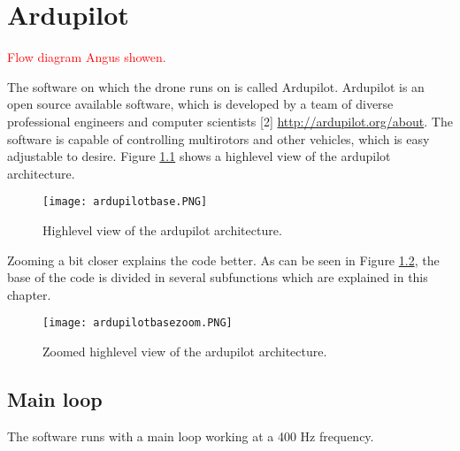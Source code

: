 \chapter{Ardupilot} \label{ch:4}
\textcolor{red}{Flow diagram Angus showen.}

The software on which the drone runs on is called Ardupilot. Ardupilot is an open source available software, which is developed by a team of diverse professional engineers and computer scientists [2] \url{http://ardupilot.org/about}. The software is capable of controlling multirotors and other vehicles, which is easy adjustable to desire. Figure \ref{fig:ardupilotbase} shows a highlevel view of the ardupilot architecture.

\begin{figure}[H]
\centering
\texttt{[image: ardupilotbase.PNG]}
\caption{Highlevel view of the ardupilot architecture.}
\label{fig:ardupilotbase}
\end{figure}

Zooming a bit closer explains the code better. As can be seen in Figure \ref{fig:ardupilotbasezoom}, the base of the code is divided in several subfunctions which are explained in this chapter.

\begin{figure}[H]
\centering
\texttt{[image: ardupilotbasezoom.PNG]}
\caption{Zoomed highlevel view of the ardupilot architecture.}
\label{fig:ardupilotbasezoom}
\end{figure}

\section{Main loop}

The software runs with a main loop working at a 400 Hz frequency.

